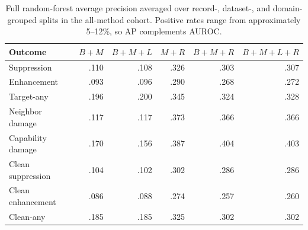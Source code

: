 \begin{table}[t]
\centering
\caption{Full random-forest average precision averaged over record-, dataset-,
and domain-grouped splits in the all-method cohort. Positive rates range from
approximately 5--12\%, so AP complements AUROC.}
\label{tab:full-prediction-ap}
\begin{tabular}{lrrrrr}
\toprule
Outcome & $B+M$ & $B+M+L$ & $M+R$ & $B+M+R$ & $B+M+L+R$ \\
\midrule
Suppression & .110 & .108 & .326 & .303 & .307 \\
Enhancement & .093 & .096 & .290 & .268 & .272 \\
Target-any & .196 & .200 & .345 & .324 & .328 \\
Neighbor damage & .117 & .117 & .373 & .366 & .366 \\
Capability damage & .170 & .156 & .387 & .404 & .403 \\
Clean suppression & .104 & .102 & .302 & .286 & .286 \\
Clean enhancement & .086 & .088 & .274 & .257 & .260 \\
Clean-any & .185 & .185 & .325 & .302 & .302 \\
\bottomrule
\end{tabular}
\end{table}

